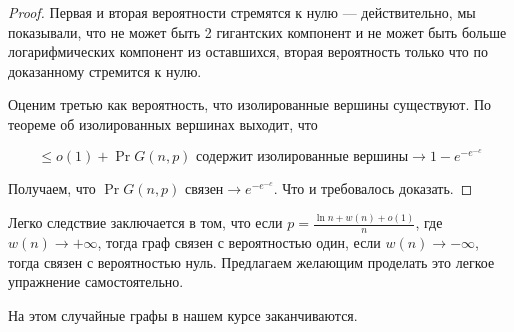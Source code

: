 \begin{proof}
  Первая и вторая вероятности стремятся к нулю --- действительно, мы показывали,
  что не может быть 2 гигантских компонент и не может быть больше логарифмических компонент
  из оставшихся, вторая вероятность только что по доказанному стремится к нулю.

  Оценим третью как вероятность, что изолированные вершины существуют.
  По теореме об изолированных вершинах выходит, что

  \[
    \leq o(1) + \Pr{G(n, p) \text{ содержит изолированные вершины}} \to 1 - e^{-e^{-c}}
  \]

  Получаем, что $\Pr{G(n, p) \text{ связен}} \to e^{-e^{-c}}$.
  Что и требовалось доказать.
\end{proof}

\begin{consequence}
  Легко следствие заключается в том, что если $p = \frac{\ln n + w(n) + o(1)}{n}$,
  где $w(n) \to +\infty$, тогда граф связен с вероятностью один, если $w(n) \to -\infty$,
  тогда связен с вероятностью нуль. Предлагаем желающим проделать это легкое упражнение
  самостоятельно.
\end{consequence}

На этом случайные графы в нашем курсе заканчиваются.

